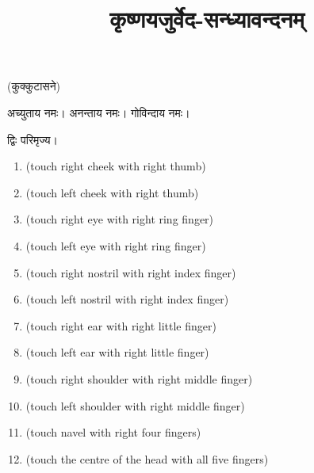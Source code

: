 \setmainfont[Script=Devanagari,Mapping=tex-text,Mapping=devanagarinumerals,AutoFakeBold=2.0]{Siddhanta}
\title{\Huge कृष्णयजुर्वेद-सन्ध्यावन्दनम्}
\date{}
\maketitle
\tableofcontents 

\clearpage
{}
\renewcommand{\sectionmark}[1]{%
\markboth{\large #1 (प्रातः सन्ध्या)}{}}

(कुक्कुटासने)

अच्युताय नमः। अनन्ताय नमः। गोविन्दाय नमः। 

द्विः परिमृज्य।


\begin{enumerate}
    \item {} {\scriptsize (touch right cheek with right thumb)}
    \item {} {\scriptsize (touch left cheek with right thumb)}
    \item {} {\scriptsize (touch right eye with right ring finger)}
    \item {} {\scriptsize (touch left eye with right ring finger)}
    \item {} {\scriptsize (touch right nostril with right index finger)}
    \item {} {\scriptsize (touch left nostril with right index finger)}
    \item {} {\scriptsize (touch right ear with right little finger)}
    \item {} {\scriptsize (touch left ear with right little finger)}
    \item {} {\scriptsize (touch right shoulder with right middle finger)}
    \item {} {\scriptsize (touch left shoulder with right middle finger)}
    \item {} {\scriptsize (touch navel with right four fingers)}
    \item {} {\scriptsize (touch the centre of the head with all five fingers)}
\end{enumerate}


